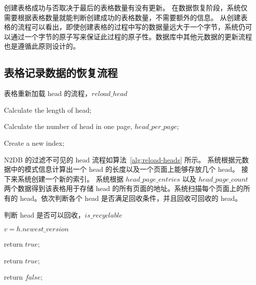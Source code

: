 创建表格成功与否取决于最后的表格数量有没有更新。
在数据恢复阶段，系统仅需要根据表格数量就能判断创建成功的表格数量，不需要额外的信息。
从创建表格的流程可以看出，即使创建表格的过程中写的数据量远大于一个字节，系统仍可以通过一个字节的原子写来保证此过程的原子性。数据库中其他元数据的更新流程也是遵循此原则设计的。



\subsection{表格记录数据的恢复流程}
\label{ssec:record-data-recovery}

\begin{algorithm}[ht]
    \caption{表格重新加载 head 的流程，$reload\_head$}
    \label{alg:reload-heads}
    \BlankLine

    Calculate the length of head;

    Calculate the number of head in one page, $head\_per\_page$;

    Create a new index;

    {
    }
\end{algorithm}



N2DB 的过滤不可见的 head 流程如算法~\ref{alg:reload-heads} 所示。
系统根据元数据中的模式信息计算出一个 head 的长度以及一个页面上能够存放几个 head。
接下来系统创建一个新的索引。
系统根据 $head\_page\_entries$ 以及 $ head\_page\_count$ 两个数据得到该表格用于存储 head 的所有页面的地址。系统扫描每个页面上的所有的 head。依次判断各个 head 是否满足回收条件，并且回收可回收的 head。

\begin{algorithm}[ht]
    \caption{判断 head 是否可以回收，$is\_recyclable$}
    \label{alg:head-visibility}
    \BlankLine

    $v = h.newest\_version$



     {
        return $true$;
    }

     {
        return $true$;
    }

    return $false$;


\end{algorithm}


